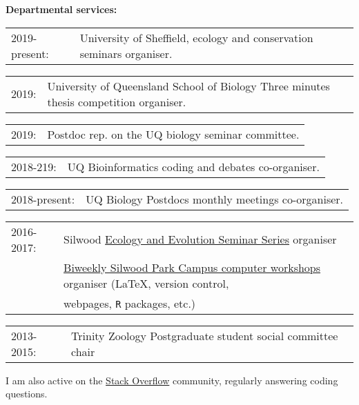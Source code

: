 \documentclass[10pt,a4paper]{article}
\begin{document}
{\raggedright\textbf{Departmental services:}
\begin{tabular}{ll}
2019-present: & University of Sheffield, ecology and conservation seminars organiser.\\
\end{tabular}
\begin{tabular}{ll}
2019: & University of Queensland School of Biology Three minutes thesis competition organiser.\\
\end{tabular}
\begin{tabular}{ll}
2019: & Postdoc rep. on the UQ biology seminar committee.\\
\end{tabular}
\begin{tabular}{ll}
2018-219: & UQ Bioinformatics coding and debates co-organiser.\\
\end{tabular}
\begin{tabular}{ll}
2018-present: & UQ Biology Postdocs monthly meetings co-organiser.\\
\end{tabular}
\begin{tabular}{ll}
2016-2017: & Silwood \href{http://www.imperial.ac.uk/silwood-park/research/thursday-seminars/}{Ecology and Evolution Seminar Series} organiser\\
    & \href{https://silwoodcomputerskillz.github.io/}{Biweekly Silwood Park Campus computer workshops} organiser (\LaTeX, version control,\\
    & webpages, \texttt{R} packages, etc.) \\
\end{tabular}
\begin{tabular}{ll}
2013-2015: & Trinity Zoology Postgraduate student social committee chair \\
\end{tabular}
\bigskip

I am also active on the \href{https://stackoverflow.com/users/9281298/thomas-guillerme}{Stack Overflow} community, regularly answering coding questions.


}
\end{document}
